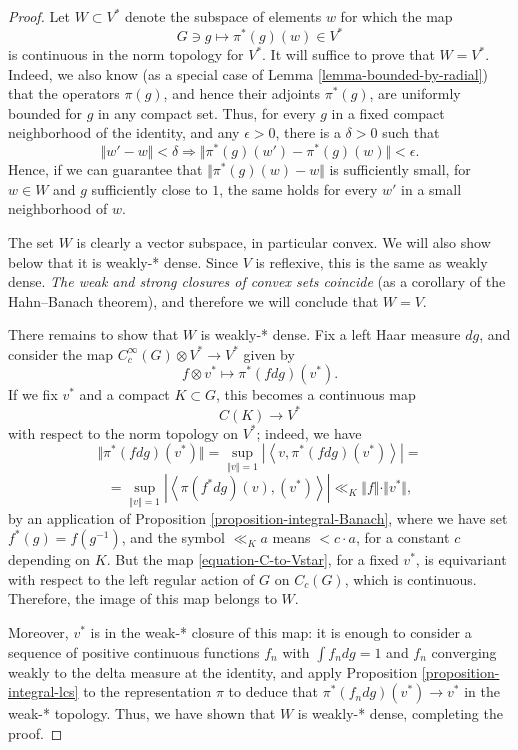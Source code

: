 \begin{proof}
Let $W\subset V^*$ denote the subspace of elements $w$ for which the map 
$$ G \ni g \mapsto \pi^*(g) (w)\in V^*$$
is continuous in the norm topology for $V^*$. It will suffice to prove that $W=V^*$. Indeed, we also know (as a special case of Lemma \ref{lemma-bounded-by-radial}) that the operators $\pi(g)$, and hence their adjoints $\pi^*(g)$, are uniformly bounded for $g$ in any compact set. Thus, for every $g$ in a fixed compact neighborhood of the identity, and any $\epsilon >0$, there is a $\delta>0$ such that 
$$ \Vert w' - w\Vert <\delta \Rightarrow \Vert \pi^*(g)(w') - \pi^*(g)(w)\Vert <\epsilon.$$
Hence, if we can guarantee that $\Vert \pi^*(g)(w) - w\Vert$ is sufficiently small, for $w\in W$ and $g$ sufficiently close to $1$, the same holds for every $w'$ in a small neighborhood of $w$. 

The set $W$ is clearly a vector subspace, in particular convex. We will also show below that it is weakly-* dense. Since $V$ is reflexive, this is the same as weakly dense. \emph{The weak and strong closures of convex sets coincide} (as a corollary of the Hahn--Banach theorem), and therefore we will conclude that $W=V$.

There remains to show that $W$ is weakly-* dense. Fix a left Haar measure $dg$, and consider the map $C_c^\infty(G)\otimes V^*\to V^*$ given by 
\begin{equation}
\label{equation-C-to-Vstar} 
f \otimes v^*\mapsto \pi^*(fdg)(v^*).
\end{equation}
If we fix $v^*$ and a compact $K\subset G$, this becomes a continuous map
$$ C(K)\to V^*$$
with respect to the norm topology on $V^*$; indeed, we have
$$ \Vert \pi^*(fdg)(v^*) \Vert = \sup_{\Vert v\Vert = 1} |\left < v, \pi^*(fdg)(v^*)\right> | = $$
$$ = \sup_{\Vert v\Vert = 1} |\left < \pi(f^*dg) (v), (v^*)\right> | \ll_K \Vert f\Vert \cdot \Vert v^*\Vert,$$
by an application of Proposition \ref{proposition-integral-Banach}, where we have set $f^*(g) = f(g^{-1})$, and the symbol $\ll_K a$ means $< c\cdot a$, for a constant $c$ depending on $K$. But the map \eqref{equation-C-to-Vstar}, for a fixed $v^*$, is equivariant with respect to the left regular action of $G$ on $C_c(G)$, which is continuous. Therefore, the image of this map belongs to $W$.


Moreover, $v^*$ is in the weak-* closure of this map: it is enough to consider a sequence of positive continuous functions $f_n$ with $\int f_n dg=1$ and $f_n$ converging weakly to the delta measure at the identity, and apply Proposition \ref{proposition-integral-lcs} to the representation $\pi$ to deduce that $\pi^*(f_ndg)(v^*)\to v^*$ in the weak-* topology. Thus, we have shown that $W$ is weakly-* dense, completing the proof.


 
 
 
\end{proof}


